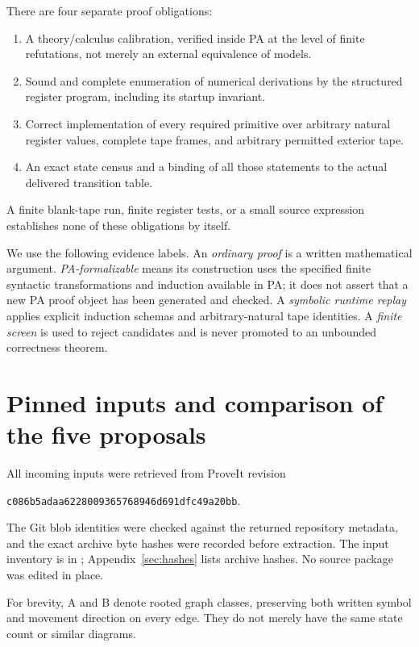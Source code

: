 \documentclass[11pt,a4paper]{article}
\newcommand{\code}[1]{\texttt{#1}}
\begin{document}
There are four separate proof obligations:
\begin{enumerate}
\item A theory/calculus calibration, verified inside PA at the level of
      finite refutations, not merely an external equivalence of models.
\item Sound and complete enumeration of numerical derivations by the
      structured register program, including its startup invariant.
\item Correct implementation of every required primitive over arbitrary
      natural register values, complete tape frames, and arbitrary permitted
      exterior tape.
\item An exact state census and a binding of all those statements to the
      actual delivered transition table.
\end{enumerate}
A finite blank-tape run, finite register tests, or a small source expression
establishes none of these obligations by itself.

We use the following evidence labels. An \emph{ordinary proof} is a written
mathematical argument. \emph{PA-formalizable} means its construction uses the
specified finite syntactic transformations and induction available in PA;
it does not assert that a new PA proof object has been generated and checked.
A \emph{symbolic runtime replay} applies explicit induction schemas and
arbitrary-natural tape identities. A \emph{finite screen} is used to reject
candidates and is never promoted to an unbounded correctness theorem.

\section{Pinned inputs and comparison of the five proposals}

All incoming inputs were retrieved from ProveIt revision
\begin{center}\small
\code{c086b5adaa6228009365768946d691dfc49a20bb}.
\end{center}
The Git blob identities were checked against the returned repository
metadata, and the exact archive byte hashes were recorded before extraction.
The input inventory is in ; Appendix~\ref{sec:hashes}
lists archive hashes. No source package was edited in place.

For brevity, A and B denote rooted graph classes, preserving both written
symbol and movement direction on every edge. They do not merely have the
same state count or similar diagrams.
\end{document}
